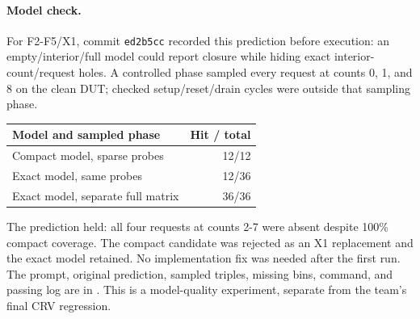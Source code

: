 \paragraph{Model check.} For F2-F5/X1, commit
\texttt{ed2b5cc} recorded this prediction before execution: an empty/interior/full model
could report closure while hiding exact interior-count/request holes.
A controlled phase sampled every request at counts 0, 1, and 8 on the clean
DUT; checked setup/reset/drain cycles were outside that sampling phase.
\begin{center}
\begin{tabular}{@{}lr@{}}
\toprule
Model and sampled phase & Hit / total \\
\midrule
Compact model, sparse probes & 12/12 \\
Exact model, same probes & 12/36 \\
Exact model, separate full matrix & 36/36 \\
\bottomrule
\end{tabular}
\end{center}
The prediction held: all four requests at counts 2-7 were absent despite
100\% compact coverage. The compact candidate was rejected as an X1
replacement and the exact model retained. No implementation fix was needed
after the first run. The prompt, original prediction, sampled triples,
missing bins, command, and passing log are in
. This is a model-quality experiment,
separate from the team's final CRV regression.

